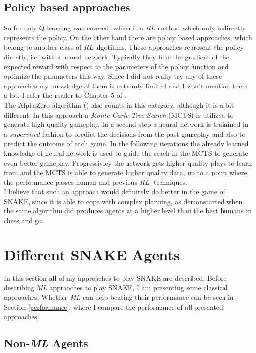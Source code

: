 \documentclass{article}
\newcommand{\RL}{\emph{RL} }
\newcommand{\ML}{\emph{ML} }
\begin{document}
\subsection{Policy based approaches}
So far only Q-learning was covered, which is a \RL method which only indirectly represents the policy. On the other hand there are policy based approaches, which belong to another class of \RL algotihms. These approaches represent the policy directly, i.e. with a neural network. Typically they take the gradient of the expected reward with respect to the parameters of the policy function and optimize the parameters this way. Since I did not really try any of these approaches my knowledge of them is extremly limited and I won't mention them a lot. I refer the reader to Chapter 5 of \cite{introRL}. \\
The AlphaZero algorithm (\cite{alphaZero}) also counts in this category, although it is a bit different. In this approach a \emph{Monte Carlo Tree Search} (MCTS) is utilized to generate high quality gameplay. In a second step a neural network is trainined in a \emph{supervised} fashion to predict the decisions from the past gameplay and also to predict the outcome of each game. In the following iterations the already learned knowledge of neural network is used to guide the seach in the MCTS to generate even better gameplay. Progressivley the network gets higher quality plays to learn from and the MCTS is able to generate higher quality data, up to a point where the performance passes human and previous \RL-techniques.\\
I believe that such an approach would definitely do better in the game of SNAKE, since it is able to cope with complex planning, as demonstarted when the same algorithm did produces agents at a higher level than the best humans in chess and go.

\section{Different SNAKE Agents}
\label{agents}
In this section all of my approaches to play SNAKE are described. Before describing \ML appraoches to play SNAKE, I am presenting some classical approaches. Whether \ML can help beating their performance can be seen in Section \ref{performance}, where I compare the performance of all presented approaches.

\subsection{Non-\ML Agents}
\end{document}
